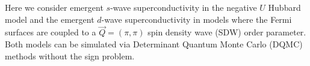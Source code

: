 \documentclass[amsmath,amssymb, aps, prl, twocolumn]{revtex4-1}
\begin{document}
Here we consider emergent $s$-wave superconductivity in the negative $U$ Hubbard model\cite{Scalettar1989, Scalapino1992} and the emergent $d$-wave superconductivity in models where the Fermi surfaces are coupled to a $\vec Q=(\pi, \pi)$ spin density wave (SDW) order parameter\cite{Erez2016}. Both models can be simulated via Determinant Quantum Monte Carlo (DQMC) methods without the sign problem. %

\end{document}
